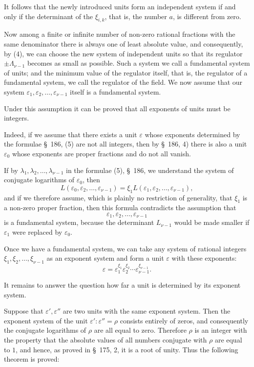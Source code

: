 \documentclass[11pt]{article}
\begin{document}
It follows that the newly introduced units form an independent system if and only if the determinant of the $\xi_{i,k}$, that is, the number $a$, is different from zero.

Now among a finite or infinite number of non-zero rational fractions with the same denominator there is always one of least absolute value, and consequently, by (4), we can choose the new system of independent units so that its regulator $\pm\Lambda_{\nu-1}$ becomes as small as possible. Such a system we call a fundamental system of units; and the minimum value of the regulator itself, that is, the regulator of a fundamental system, we call the regulator of the field. We now assume that our system $\varepsilon_1,\varepsilon_2,\ldots,\varepsilon_{\nu-1}$ itself is a fundamental system.

Under this assumption it can be proved that all exponents of units must be integers.

Indeed, if we assume that there exists a unit $\varepsilon$ whose exponents determined by the formulae \S~186, (5) are not all integers, then by \S~186, 4) there is also a unit $\varepsilon_0$ whose exponents are proper fractions and do not all vanish.

If by $\lambda_1,\lambda_2,\ldots,\lambda_{\nu-1}$ in the formulae (5), \S~186, we understand the system of conjugate logarithms of $\varepsilon_0$, then
\[
L(\varepsilon_0,\varepsilon_2,\ldots,\varepsilon_{\nu-1})=\xi_1L(\varepsilon_1,\varepsilon_2,\ldots,\varepsilon_{\nu-1}),
\]
and if we therefore assume, which is plainly no restriction of generality, that $\xi_1$ is a non-zero proper fraction, then this formula contradicts the assumption that
\[
\varepsilon_1,\varepsilon_2,\ldots,\varepsilon_{\nu-1}
\]
is a fundamental system, because the determinant $L_{\nu-1}$ would be made smaller if $\varepsilon_1$ were replaced by $\varepsilon_0$.

Once we have a fundamental system, we can take any system of rational integers $\xi_1,\xi_2,\ldots,\xi_{\nu-1}$ as an exponent system and form a unit $\varepsilon$ with these exponents:
\[
\varepsilon=\varepsilon_1^{\xi_1}\varepsilon_2^{\xi_2}\cdots\varepsilon_{\nu-1}^{\xi_{\nu-1}}.
\]

It remains to answer the question how far a unit is determined by its exponent system.

Suppose that $\varepsilon',\varepsilon''$ are two units with the same exponent system. Then the exponent system of the unit $\varepsilon':\varepsilon''=\rho$ consists entirely of zeros, and consequently the conjugate logarithms of $\rho$ are all equal to zero. Therefore $\rho$ is an integer with the property that the absolute values of all numbers conjugate with $\rho$ are equal to $1$, and hence, as proved in \S~175, 2, it is a root of unity. Thus the following theorem is proved:
\end{document}
